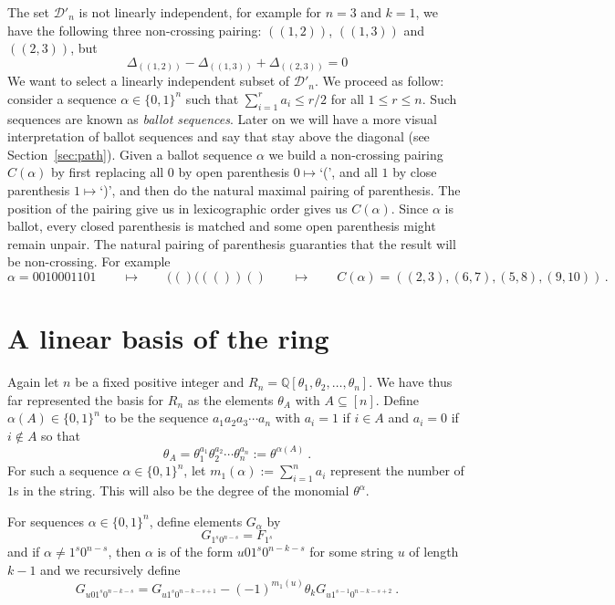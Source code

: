\documentclass[11pt]{amsart}
\newcommand{\defncolor}{\color{darkred}}
\newcommand{\defn}[1]{{\defncolor\emph{#1}}} %
\theoremstyle{definition}
\numberwithin{equation}{section}
\begin{document}
The set ${\mathcal D}'_n$ is not linearly independent, for example for $n=3$ and $k=1$, we have the following three non-crossing pairing:
$((1,2))$, $((1,3))$ and $((2,3))$, but
$$\Delta_{((1,2))} - \Delta_{((1,3))} + \Delta_{((2,3))} =0 $$
We want to select a linearly independent subset of ${\mathcal D}'_n$. We proceed as follow: consider a sequence
$\alpha \in \{0, 1\}^n$ such that $\sum_{i=1}^r a_i \leq r/2$ for all $1 \leq r \leq n$. 
Such sequences are known as \defn{ballot sequences}. Later on we will have a more visual interpretation of ballot sequences and say that stay above the diagonal (see Section~\ref{sec:path}). Given a ballot sequence $\alpha$ we build a non-crossing pairing $C(\alpha)$ by first replacing all $0$ by open parenthesis $0\mapsto$`(',
and all $1$ by close parenthesis $1\mapsto$`)', and then do the natural maximal pairing of parenthesis. The position of the pairing give us in lexicographic order gives us $C(\alpha)$.  Since $\alpha$ is ballot, every  closed parenthesis is matched and some open parenthesis might remain unpair. The natural pairing of parenthesis guaranties that the result will be non-crossing. For example
$$ \alpha=0010001101\qquad \mapsto\qquad (()((())()\qquad \mapsto \qquad C(\alpha)=((2,3),(6,7),(5,8),(9,10)) \,.$$



\section{A linear basis of the ring}

Again let $n$ be a fixed positive integer and $R_n = {\mathbb Q}[\theta_1, \theta_2, \ldots, \theta_n]$.
We have thus far represented the basis for
$R_n$ as the elements $\theta_A$ with $A \subseteq [n]$.  Define $\alpha(A) \in \{ 0,1\}^n$ to be
the sequence $a_1 a_2 a_3 \cdots a_n$ with $a_i = 1$ if $i \in A$ and
$a_i = 0$ if $i \notin A$ so that
\[
\theta_A = \theta_1^{a_1} \theta_2^{a_2} \cdots \theta_n^{a_n} := \theta^{\alpha(A)}~.
\]
For such a sequence $\alpha \in \{0,1\}^n$, let $m_1(\alpha) := \sum_{i=1}^n a_i$
represent the number of $1$s in the string.  This will also be the degree of the monomial
$\theta^{\alpha}$.

For sequences $\alpha \in \{ 0, 1 \}^n$, define elements $G_\alpha$ by
\begin{equation}\label{eq:Gdef1}
G_{1^s0^{n-s}} = F_{1^s}
\end{equation}
and if $\alpha \neq 1^s 0^{n-s}$, then $\alpha$ is of the form $u01^s0^{n-k-s}$ for some string $u$
of length $k-1$ and we recursively define
\begin{equation}\label{eq:Gdef2}
G_{u01^s0^{n-k-s}} = G_{u1^s0^{n-k-s+1}} - (-1)^{m_1(u)} \theta_k G_{u1^{s-1}0^{n-k-s+2}}~.
\end{equation}
\end{document}
